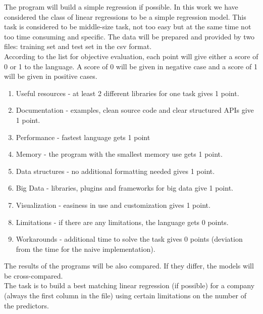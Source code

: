 \documentclass[
  twoside,
  12pt, a4paper,
  footinclude=true,
  headinclude=true,
  cleardoublepage=empty
]{article}
\begin{document}
The program will build a simple regression if possible. In this work we have considered the class of linear regressions to be a simple regression model. This task is considered to be middle-size task, not too easy but at the same time not too time consuming and specific.
The data will be prepared and provided by two files: training set and test set in the csv format.\\
According to the list for objective evaluation, each point will give either a score of 0 or 1 to the language. A score of 0 will be given in negative case and a score of 1 will be given in positive cases.
\begin{enumerate}
    \item[] Useful resources - at least 2 different libraries for one task gives 1 point.
    \item[] Documentation - examples, clean source code and clear structured APIs give 1 point.
    \item[] Performance - fastest language gets 1 point
    \item[] Memory - the program with the smallest memory use gets 1 point.
    \item[] Data structures - no additional formatting needed gives 1 point.
    \item[] Big Data - libraries, plugins and frameworks for big data give 1 point.
    \item[] Visualization - easiness in use and customization gives 1 point.
    \item[] Limitations - if there are any limitations, the language gets 0 points.
    \item[] Workarounds - additional time to solve the task gives 0 points (deviation from the time for the naive implementation).
\end{enumerate}
The results of the programs will be also compared. If they differ, the models will be cross-compared.\\
The task is to build a best matching linear regression (if possible) for a company (always the first column in the file) using certain limitations on the number of the predictors.
\end{document}
